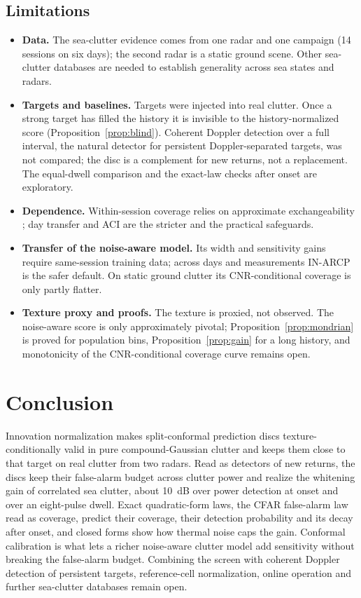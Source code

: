 \documentclass[journal]{IEEEtran}
\begin{document}
\subsection{Limitations}
\begin{itemize}[leftmargin=*,itemsep=1pt]
\item \textbf{Data.} The sea-clutter evidence comes from one radar and one campaign (14 sessions on six days); the second radar is a static ground scene. Other sea-clutter databases \cite{dewind2010csir} are needed to establish generality across sea states and radars.
\item \textbf{Targets and baselines.} Targets were injected into real clutter. Once a strong target has filled the history it is invisible to the history-normalized score (Proposition~\ref{prop:blind}). Coherent Doppler detection over a full interval, the natural detector for persistent Doppler-separated targets, was not compared; the disc is a complement for new returns, not a replacement. The equal-dwell comparison and the exact-law checks after onset are exploratory.
\item \textbf{Dependence.} Within-session coverage relies on approximate exchangeability \cite{barber2023}; day transfer and ACI are the stricter and the practical safeguards.
\item \textbf{Transfer of the noise-aware model.} Its width and sensitivity gains require same-session training data; across days and measurements IN-ARCP is the safer default. On static ground clutter its CNR-conditional coverage is only partly flatter.
\item \textbf{Texture proxy and proofs.} The texture is proxied, not observed. The noise-aware score is only approximately pivotal; Proposition~\ref{prop:mondrian} is proved for population bins, Proposition~\ref{prop:gain} for a long history, and monotonicity of the CNR-conditional coverage curve remains open.
\end{itemize}

\section{Conclusion}
Innovation normalization makes split-conformal prediction discs texture-conditionally valid in pure compound-Gaussian clutter and keeps them close to that target on real clutter from two radars. Read as detectors of new returns, the discs keep their false-alarm budget across clutter power and realize the whitening gain of correlated sea clutter, about 10~dB over power detection at onset and over an eight-pulse dwell. Exact quadratic-form laws, the CFAR false-alarm law read as coverage, predict their coverage, their detection probability and its decay after onset, and closed forms show how thermal noise caps the gain. Conformal calibration is what lets a richer noise-aware clutter model add sensitivity without breaking the false-alarm budget. Combining the screen with coherent Doppler detection of persistent targets, reference-cell normalization, online operation and further sea-clutter databases remain open.
\end{document}
